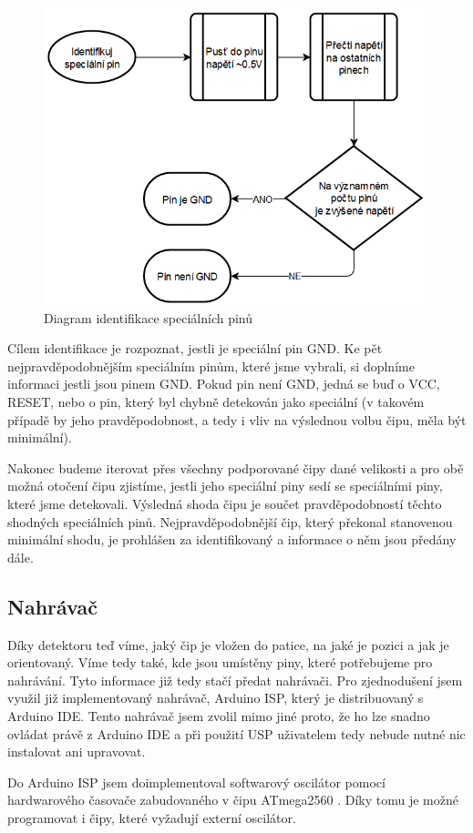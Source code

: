 \documentclass[11pt,a4paper,twoside,openright]{report}
\begin{document}
\begin{figure}
  \includegraphics[width=0.6\linewidth]{img/identify_special_diagram.png}
  \centering
  \caption{Diagram identifikace speciálních pinů}
  \label{fig:detect_special}
\end{figure}

Cílem identifikace je rozpoznat, jestli je speciální pin GND. Ke pět nejpravděpodobnějším speciálním pinům, které jsme vybrali, si doplníme informaci jestli jsou pinem GND. Pokud pin není GND, jedná se buď o VCC, RESET, nebo o pin, který byl chybně detekován jako speciální (v takovém případě by jeho pravděpodobnost, a tedy i vliv na výslednou volbu čipu, měla být minimální).

Nakonec budeme iterovat přes všechny podporované čipy dané velikosti a pro obě možná otočení čipu zjistíme, jestli jeho speciální piny sedí se speciálními piny, které jsme detekovali. Výsledná shoda čipu je součet pravděpodobností těchto shodných speciálních pinů. Nejpravděpodobnější čip, který překonal stanovenou minimální shodu, je prohlášen za identifikovaný a informace o něm jsou předány dále.

\subsection {Nahrávač \label{software:uploader}}

Díky detektoru teď víme, jaký čip je vložen do patice, na jaké je pozici a jak je orientovaný. Víme tedy také, kde jsou umístěny piny, které potřebujeme pro nahrávání. Tyto informace již tedy stačí předat nahrávači. Pro zjednodušení jsem využil již implementovaný nahrávač, Arduino ISP, který je distribuovaný s Arduino IDE. Tento nahrávač jsem zvolil mimo jiné proto, že ho lze snadno ovládat právě z Arduino IDE a při použití USP uživatelem tedy nebude nutné nic instalovat ani upravovat.

Do Arduino ISP jsem doimplementoval softwarový oscilátor pomocí hardwarového časovače zabudovaného v čipu ATmega2560 \cite{atmega2560}. Díky tomu je možné programovat i čipy, které vyžadují externí oscilátor.
\end{document}
